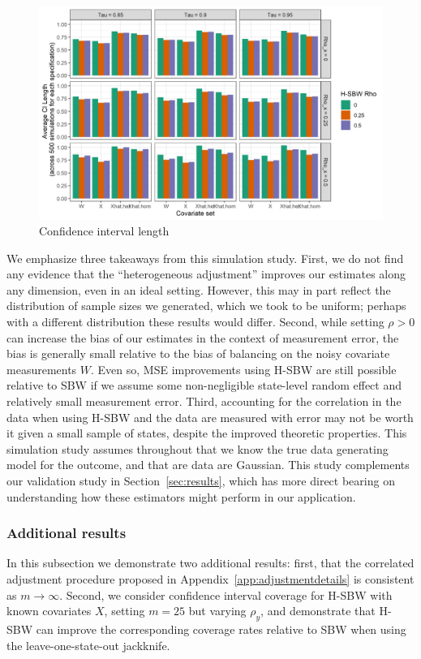 \begin{figure}[H]\label{fig:ciwidth}
\begin{center}
    \caption{Confidence interval length}\label{fig:simcoverage2}
    \includegraphics[scale=0.5]{01_Plots/ci-length-plot.png}
\end{center}
\end{figure}

We emphasize three takeaways from this simulation study. First, we do not find any evidence that the ``heterogeneous adjustment'' improves our estimates along any dimension, even in an ideal setting. However, this may in part reflect the distribution of sample sizes we generated, which we took to be uniform; perhaps with a different distribution these results would differ. Second, while setting $\rho > 0$ can increase the bias of our estimates in the context of measurement error, the bias is generally small relative to the bias of balancing on the noisy covariate measurements $W$. Even so, MSE improvements using H-SBW are still possible relative to SBW if we assume some non-negligible state-level random effect and relatively small measurement error. Third, accounting for the correlation in the data when using H-SBW and the data are measured with error may not be worth it given a small sample of states, despite the improved theoretic properties. This simulation study assumes throughout that we know the true data generating model for the outcome, and that are data are Gaussian. This study complements our validation study in Section~\ref{sec:results}, which has more direct bearing on understanding how these estimators might perform in our application.

\subsubsection{Additional results}\label{appssec:simstudyresults2}

In this subsection we demonstrate two additional results: first, that the correlated adjustment procedure proposed in Appendix~\ref{app:adjustmentdetails} is consistent as $m \to \infty$. Second, we consider confidence interval coverage for H-SBW with known covariates $X$, setting $m = 25$ but varying $\rho_y$, and demonstrate that H-SBW can improve the corresponding coverage rates relative to SBW when using the leave-one-state-out jackknife. 
